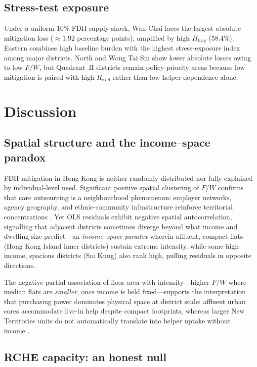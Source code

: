 \documentclass[11pt,a4paper]{article}
\begin{document}
\subsection{Stress-test exposure}

Under a uniform 10\% FDH supply shock, Wan Chai faces the largest absolute mitigation loss (${\approx}1.92$ percentage points), amplified by high $H_{\mathrm{frag}}$ (58.4\%). Eastern combines high baseline burden with the highest stress-exposure index among major districts. North and Wong Tai Sin show lower absolute losses owing to low $F/W$, but Quadrant~II districts remain policy-priority areas because low mitigation is paired with high $R_{\mathrm{excl}}$ rather than low helper dependence alone.

\section{Discussion}

\subsection{Spatial structure and the income--space paradox}

FDH mitigation in Hong Kong is neither randomly distributed nor fully explained by individual-level need. Significant positive spatial clustering of $F/W$ confirms that care outsourcing is a neighbourhood phenomenon: employer networks, agency geography, and ethnic-community infrastructure reinforce territorial concentrations \citep{anselin1995}. Yet OLS residuals exhibit negative spatial autocorrelation, signalling that adjacent districts sometimes diverge beyond what income and dwelling size predict---an \emph{income--space paradox} wherein affluent, compact flats (Hong Kong Island inner districts) sustain extreme intensity, while some high-income, spacious districts (Sai Kung) also rank high, pulling residuals in opposite directions.

The negative partial association of floor area with intensity---higher $F/W$ where median flats are \emph{smaller}, once income is held fixed---supports the interpretation that purchasing power dominates physical space at district scale: affluent urban cores accommodate live-in help despite compact footprints, whereas larger New Territories units do not automatically translate into helper uptake without income \citep{constable2007}.

\subsection{RCHE capacity: an honest null}
\end{document}
